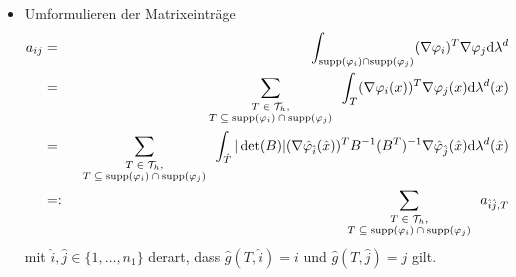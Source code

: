 \documentclass{book}
\newcommand{\mathd}{\mathrm{d}}
\newcommand{\tmop}[1]{\ensuremath{\operatorname{#1}}}
\newcommand{\tmscript}[1]{\text{\scriptsize{$#1$}}}
\newenvironment{itemizedot}{\begin{itemize} \renewcommand{\labelitemi}{$\bullet$}\renewcommand{\labelitemii}{$\bullet$}\renewcommand{\labelitemiii}{$\bullet$}\renewcommand{\labelitemiv}{$\bullet$}}{\end{itemize}}
\begin{document}
\begin{remark*}
\begin{itemizedot}
    \item Umformulieren der Matrixeintr{\"a}ge
    \begin{eqnarray*}
      a_{i j} & = & \int_{\tmop{supp} (\varphi_i) \cap \tmop{supp}
      (\varphi_j)} (\nabla \varphi_i)^T \nabla \varphi_j \mathd \lambda^d\\
      & = & \sum_{\tmscript{\begin{array}{c}
        T \in \mathcal{T}_h,\\
        T \subseteq \tmop{supp} (\varphi_i) \cap \tmop{supp} (\varphi_j)
      \end{array}}} \int_T (\nabla \varphi_i (x))^T \nabla \varphi_j (x)
      \mathd \lambda^d (x)\\
      & = & \sum_{\tmscript{\begin{array}{c}
        T \in \mathcal{T}_h,\\
        T \subseteq \tmop{supp} (\varphi_i) \cap \tmop{supp} (\varphi_j)
      \end{array}}} \int_{\hat{T}} | \det (B) | (\nabla
      \hat{\varphi}_{\hat{i}} (\hat{x}))^T B^{- 1} (B^T)^{- 1} \nabla
      \hat{\varphi}_{\hat{j}} (\hat{x}) \mathd \lambda^d (\hat{x})\\
      & = : & \sum_{\tmscript{\begin{array}{c}
        T \in \mathcal{T}_h,\\
        T \subseteq \tmop{supp} (\varphi_i) \cap \tmop{supp} (\varphi_j)
      \end{array}}} a_{\hat{i} \hat{j}, T}
    \end{eqnarray*}
    mit $\hat{i}, \hat{j} \in \{ 1, \ldots, n_1 \}$ derart, dass $\hat{g} (T,
    \hat{i}) = i$ und $\hat{g} (T, \hat{j}) = j$ gilt.
    

\end{itemizedot}
\end{remark*}
\end{document}
